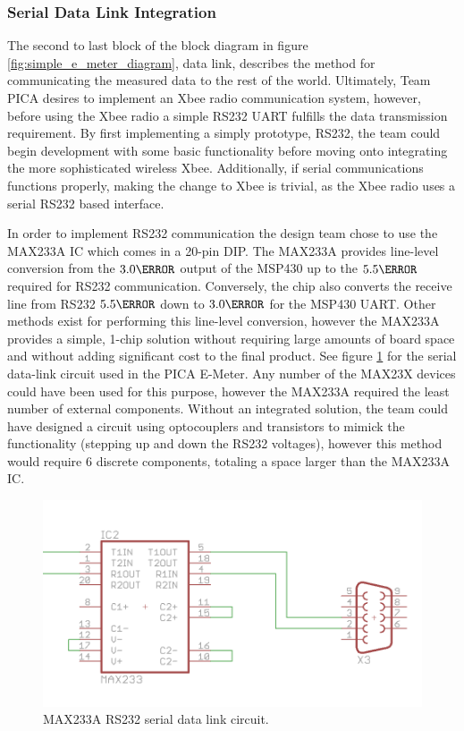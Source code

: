 \subsubsection{Serial Data Link Integration}
The second to last block of the block diagram in figure \ref{fig:simple_e_meter_diagram}, data link, describes the method for communicating the measured data to the rest of the world. Ultimately, Team PICA desires to implement an Xbee radio communication system, however, before using the Xbee radio a simple RS232 \ac{UART} fulfills the data transmission requirement. By first implementing a simply prototype, \ac{RS232}, the team could begin development with some basic functionality before moving onto integrating the more sophisticated wireless Xbee. Additionally, if serial communications functions properly, making the change to Xbee is trivial, as the Xbee radio uses a serial RS232 based interface.

In order to implement RS232 communication the design team chose to use the MAX233A \ac{IC} which comes in a 20-pin \ac{DIP}. The MAX233A provides line-level conversion from the $3.0\volt$ output of the MSP430 up to the $5.5\volt$ required for RS232 communication. Conversely, the chip also converts the receive line from RS232 $5.5\volt$ down to $3.0\volt$ for the MSP430 \ac{UART}. Other methods exist for performing this line-level conversion, however the MAX233A provides a simple, 1-chip solution without requiring large amounts of board space and without adding significant cost to the final product. See figure \ref{fig:max233a_serial_data_link} for the serial data-link circuit used in the PICA E-Meter. Any number of the MAX23X devices could have been used for this purpose, however the MAX233A required the least number of external components. Without an integrated solution, the team could have designed a circuit using optocouplers and transistors to mimick the functionality (stepping up and down the RS232 voltages), however this method would require 6 discrete components, totaling a space larger than the MAX233A \ac{IC}.
\begin{figure}[htbp]
\begin{center}
\includegraphics[width=5in]{includes/max233a_circuit}
\caption{MAX233A RS232 serial data link circuit.}
\label{fig:max233a_serial_data_link}
\end{center}
\end{figure}

